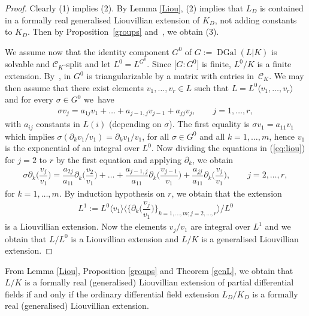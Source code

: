 \documentclass[10pt,a4paper]{amsart}
\numberwithin{equation}{section}
\def \DGal{\operatorname{DGal}}
\begin{document}
\begin{proof} Clearly (1) implies (2). By Lemma \ref{Liou}, (2) implies that $L_D$ is contained in a formally real generalised Liouvillian extension of $K_D$, not adding constants to $K_D$. Then by Proposition~\ref{groups} and~\cite[Theorem~18]{CH}, we obtain (3).

We assume now that the identity component $G^0$ of $G:=\DGal(L|K)$ is solvable and $\mathcal{C}_K$-split and let $L^0=L^{G^0}$. Since $\big[G:G^0\big]$ is finite, $L^0/K$ is a finite extension. By~\cite[Chapter~V, Theorem~15.4]{B}, in $G^0$ is triangularizable by a matrix with entries in~$\mathcal{C}_K$. We may then assume that there exist elements
$v_1,\dots,v_r \in L$ such that $L=L^0\langle v_1,\dots,v_r \rangle$ and for every $\sigma \in G^0$ we~have
\begin{gather}\label{eq:liou}
\sigma v_j = a_{1j} v_1 + \dots + a_{j-1,j} v_{j-1}+a_{jj} v_j , \qquad j=1,\dots,r,
\end{gather}
with $a_{ij}$ constants in $L(i)$ (depending on $\sigma$). The first equality is $\sigma v_1=a_{11} v_1$ which implies $\sigma(\partial_k v_1/v_1)=\partial_k v_1/v_1$, for all $\sigma \in G^0$ and all $k=1,\dots,m$, hence $v_1$ is the exponential of an integral over $L^0$. Now dividing the equations in (\ref{eq:liou}) for $j=2$ to $r$ by the first equation and applying $\partial_k$, we obtain
\begin{gather*}
\sigma \partial_k \bigg(\dfrac {v_j}{v_1}\bigg)
= \dfrac {a_{2j}}{a_{11}} \partial_k \bigg(\dfrac{v_2}{v_1} \bigg)+ \dots + \dfrac {a_{j-1,j}}{a_{11}} \partial_k \bigg(\dfrac{ v_{j-1}}{v_1} \bigg)+
\dfrac{a_{jj}}{a_{11}} \partial_k \bigg(\dfrac{ v_j}{v_1} \bigg), \qquad j=2,\dots,r,
\end{gather*}
for $k=1,\dots,m$. By induction hypothesis on $r$, we obtain that the extension
\begin{gather*}
L^1:=L^0\langle v_1 \rangle \bigg\langle \bigg\{\partial_k \bigg(\dfrac {v_j}{v_1}\bigg)\bigg\}_{k=1,\dots,m; j=2,\dots,r}\bigg\rangle\Big/L^0
\end{gather*}
is a Liouvillian extension. Now the elements $v_j/v_1$ are integral over $L^1$ and we obtain that $L/L^0$ is a Liouvillian extension and $L/K$ is a generalised Liouvillian extension.
\end{proof}


\begin{Remark}
From Lemma \ref{Liou}, Proposition \ref{groups} and Theorem \ref{genL}, we obtain that $L/K$ is a formally real (generalised) Liouvillian extension of partial differential fields if and only if the ordinary differential field extension $L_D/K_D$ is a formally real (generalised) Liouvillian extension.
\end{Remark}
\end{document}
